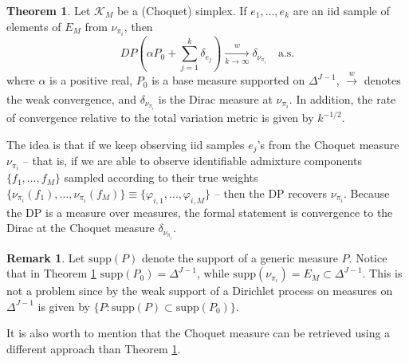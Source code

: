 \documentclass[12pt, reqno]{amsart}
\theoremstyle{definition}
\newtheorem{theorem}{Theorem}%
\newtheorem{remark}{Remark}
\begin{document}












\begin{theorem}\label{thm1}
Let $\mathcal{K}_M$ be a (Choquet) simplex. If $e_1,\ldots,e_k$ are an iid sample of elements of $E_M$ from $\nu_{\pi_i}$, then 
\begin{equation}\label{polya_eq}
DP \left(\alpha P_0 + \sum_{j=1}^k \delta_{e_j} \right) \xrightarrow[k \rightarrow \infty]{w} \delta_{\nu_{\pi_i}} \quad \text{a.s.}
\end{equation}
where $\alpha$ is a positive real, $P_0$ is a base measure supported on $\Delta^{J-1}$, $\xrightarrow[]{w}$ denotes the weak convergence, and $\delta_{\nu_{\pi_i}}$ is the Dirac measure at $\nu_{\pi_i}$. In addition, the rate of convergence relative to the total variation metric is given by $k^{-1/2}$.
\end{theorem}
The idea is that if we keep observing iid samples $e_j$'s from the Choquet measure $\nu_{\pi_i}$ -- that is, if we are able to observe identifiable admixture components $\{f_1,\ldots,f_M\}$ sampled according to their true weights $\{\nu_{\pi_i}(f_1),\ldots,\nu_{\pi_i}(f_M)\}\equiv\{\varphi_{i,1},\ldots,\varphi_{i,M}\}$ -- then the DP recovers $\nu_{\pi_i}$. Because the DP is a measure over measures, the formal statement is convergence to the Dirac at the Choquet measure $\delta_{\nu_{\pi_i}}$. 

\begin{remark}\label{rem_proc}
Let $\text{supp}(P)$ denote the support of a generic measure $P$. Notice that in Theorem \ref{thm1} $\text{supp}(P_0)=\Delta^{J-1}$, while $\text{supp}(\nu_{\pi_i})=E_M\subset\Delta^{J-1}$. This is not a problem since by \cite[Theorem 4.15]{ghosal_vdv} the weak support of a Dirichlet process on measures on $\Delta^{J-1}$ is given by $\{P: \text{supp}(P)\subset \text{supp}(P_0)\}$.

It is also worth to mention that the Choquet measure can be retrieved using a different approach than Theorem \ref{thm1}. 
\end{remark}
\fi
\end{document}
